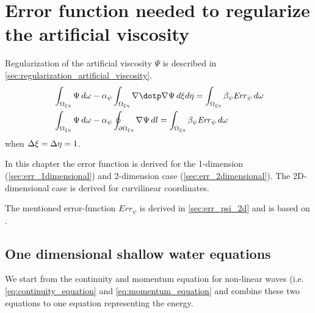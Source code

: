 \chapter{Error function needed to regularize the artificial viscosity} \label{sec:error_artificial_viscosity}
Regularization of the artificial viscosity $\Psi$ is described in \autoref{sec:regularization_artificial_viscosity}.
\begin{align}
    &\int_{\Omega_{\xi\eta}} \Psi\, d\omega - \alpha_{\psi} \int_{\Omega_{\xi\eta}} \nabla \dotp \nabla \Psi\, d\xi d\eta = \int_{\Omega_{\xi\eta}} \beta_{\psi} \mathit{Err}_{\psi}\, d\omega
    \label{eq:reg_artificial_viscosity}
    \\*
    &\int_{\Omega_{\xi\eta}} \Psi\, d\omega
    - \alpha_{\psi} \oint_{\partial\Omega_{\xi\eta}} \nabla \Psi\, dl
    = \int_{\Omega_{\xi\eta}} \beta_{\psi} \mathit{Err}_{\psi}\, d\omega
\end{align}
when $\Delta \xi = \Delta \eta = 1$.

In this chapter the error function is derived for the 1-dimension (\autoref{sec:err_1dimensional}) and 2-dimension case (\autoref{sec:err_2dimensional}).
The 2D-dimensional case is derived for curvilinear coordinates.

The mentioned error-function $Err_{\psi}$ is derived in \autoref{sec:err_psi_2d} and is based on \citet[eq.\ 42]{Borsboom2001}.


\section{One dimensional shallow water equations}\label{sec:err_1dimensional}

We start from the continuity and momentum equation for non-linear waves (i.e. \autoref{eq:continuity_equation} and \eqref{eq:momentum_equation} and combine these two equations to one equation representing the energy.

